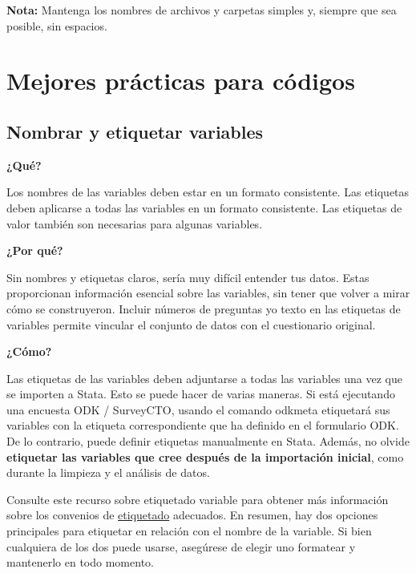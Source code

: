 \documentclass[11pt,en]{elegantpaper}
\begin{document}
\textbf{Nota:} Mantenga los nombres de archivos y carpetas simples y, siempre que sea posible, sin espacios.

\newpage 
\section{Mejores prácticas para códigos}
\label{sec:practicas}

\subsection{Nombrar y etiquetar variables}
\label{sec:variables}

\textbf{¿Qué?}

Los nombres de las variables deben estar en un formato consistente. Las etiquetas deben aplicarse a todas las variables en un formato consistente. Las etiquetas de valor también son necesarias para algunas variables.

\textbf{¿Por qué?} 

Sin nombres y etiquetas claros, sería muy difícil entender tus datos. Estas proporcionan información esencial sobre las variables, sin tener que volver a mirar cómo se construyeron. Incluir números de preguntas y\/o texto en las etiquetas de variables permite vincular el conjunto de datos con el cuestionario original.

\textbf{¿Cómo?} 

Las etiquetas de las variables deben adjuntarse a todas las variables una vez que se importen a Stata. Esto se puede hacer de varias maneras. Si está ejecutando una encuesta ODK / SurveyCTO, usando el comando odkmeta etiquetará sus variables con la etiqueta correspondiente que ha definido en el formulario ODK. De lo contrario, puede definir etiquetas manualmente en Stata. Además, no olvide \textbf{etiquetar las variables que cree después de la importación inicial}, como durante la limpieza y el análisis de datos.

Consulte este recurso sobre etiquetado variable para obtener más información sobre los convenios de \href{https://www.poverty-action.org/sites/default/files/Naming-and-Labeling-Data.pdf}{etiquetado} adecuados. En resumen, hay dos opciones principales para etiquetar en relación con el nombre de la variable. Si bien cualquiera de los dos puede usarse, asegúrese de elegir uno formatear y mantenerlo en todo momento.
\end{document}

